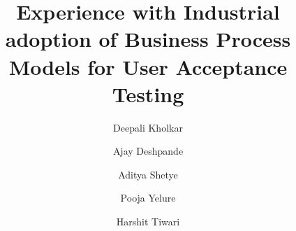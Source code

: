 
  \title{Experience with Industrial adoption of Business Process Models for User Acceptance Testing}

  \author{Deepali Kholkar \and Ajay Deshpande \and Aditya Shetye \and Pooja Yelure \and Harshit Tiwari}

  
\maketitle
\clearpage
\setcounter{page}{202}